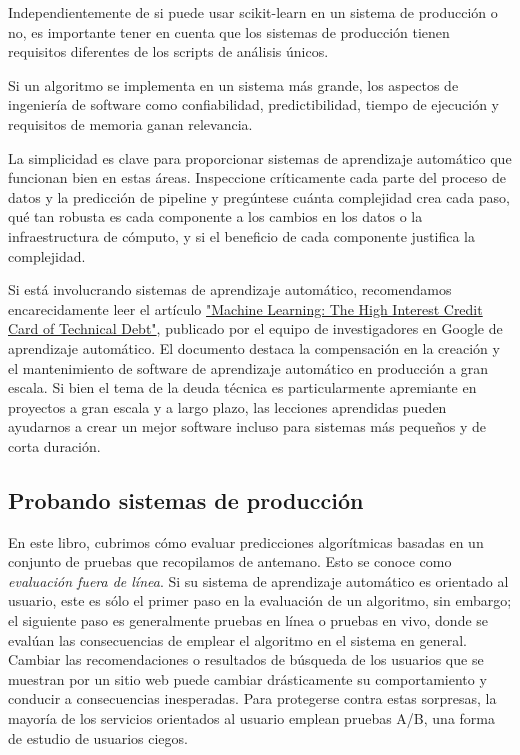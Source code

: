 Independientemente de si puede usar {\ttfamily scikit-learn}  en un sistema de producción o no, es importante tener en cuenta que los sistemas de producción tienen requisitos diferentes de los scripts de análisis únicos.

Si un algoritmo se implementa en un sistema más grande, los aspectos de ingeniería de software como confiabilidad,  predictibilidad, tiempo de ejecución y requisitos de memoria ganan relevancia.

La simplicidad es clave para proporcionar sistemas de aprendizaje automático que funcionan bien en estas áreas. Inspeccione críticamente cada parte del proceso de datos y la  predicción de  pipeline y pregúntese cuánta complejidad crea cada paso, qué tan robusta es cada componente a los cambios en los datos o la infraestructura de cómputo, y si el beneficio de cada componente justifica la complejidad.



Si  está involucrando sistemas de   aprendizaje automático, recomendamos encarecidamente leer el artículo \href{https://research.google/pubs/pub43146/}{\textcolor{vino}{"{}Machine Learning: The High Interest Credit Card of Technical Debt"{}}}, publicado por el equipo de investigadores en Google de aprendizaje automático. 
El documento destaca la compensación en la creación y el mantenimiento de software de aprendizaje automático en producción a gran escala. Si bien el tema de la deuda técnica es particularmente apremiante en proyectos a gran escala y a largo plazo, las lecciones aprendidas pueden ayudarnos a crear un mejor software incluso para sistemas más pequeños y de corta duración.\\

\subsection{Probando sistemas de producción}




 En este libro, cubrimos cómo evaluar predicciones algorítmicas basadas en un conjunto de pruebas que recopilamos de antemano. Esto se conoce como  \emph{evaluación fuera de línea}. Si su sistema de aprendizaje automático es orientado al usuario, este es sólo el primer paso en la evaluación de un algoritmo, sin embargo; el siguiente paso es generalmente pruebas en línea o pruebas en vivo, donde se evalúan las consecuencias de emplear el algoritmo en el sistema en general. 
Cambiar las recomendaciones o resultados de búsqueda de los usuarios que se muestran por un sitio web puede cambiar drásticamente su comportamiento y conducir a consecuencias inesperadas.  Para protegerse  contra estas sorpresas, la mayoría de los servicios orientados al usuario emplean pruebas A/B, una forma de estudio de usuarios ciegos.


